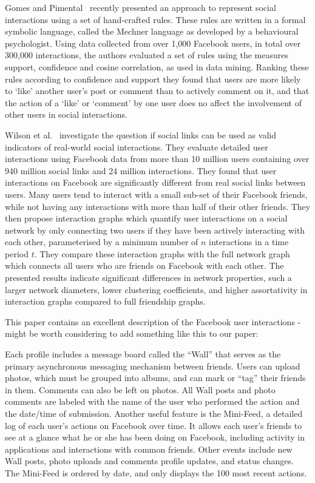\documentclass[letterpaper]{article}
\begin{document}
Gomes and Pimental~\cite{gomes2011social} recently presented an approach to represent social interactions using a set of hand-crafted rules. These rules are written in a formal symbolic language, called the Mechner language as developed by a behavioural psychologist. Using data collected from over 1,000 Facebook users, in total over 300,000 interactions, the authors evaluated a set of rules using the measures support, confidence and cosine correlation, as used in data mining. Ranking these rules according to confidence and support they found that users are more likely to `like' another user's post or comment than to actively comment on it, and that the action of a `like' or `comment' by one user does no affect the involvement of other users in social interactions.




Wilson et al.~\cite{wilson2009user} investigate the question if social links can be used as valid indicators of real-world social interactions. They evaluate detailed user interactions using Facebook data from more than 10 million users containing over 940 million social links and 24 million interactions. They found that user interactions on Facebook are significantly different from real social links between users. Many users tend to interact with a small sub-set of their Facebook friends, while not having any interactions with more than half of their other friends. They then propose interaction graphs which quantify user interactions on a social network by only connecting two users if they have been actively interacting with each other, parameterised by a minimum number of $n$ interactions in a time period $t$. They compare these interaction graphs with the full network graph which connects all users who are friends on Facebook with each other. The presented results indicate significant differences in network properties, such a larger network diameters, lower clustering coefficients, and higher assortativity in interaction graphs compared to full friendship graphs.






This paper contains an excellent description of the Facebook user interactions - might be worth considering to add something like this to our paper:


Each profile includes a message board called the “Wall” that serves as the primary asynchronous messaging mechanism between friends. Users can upload photos, which must be grouped into albums, and can mark or “tag” their friends in them. Comments can also be left on photos. All Wall posts and photo comments are labeled with the name of the user who performed the action and the date/time of submission. Another useful feature is the Mini-Feed, a detailed log of each user’s actions on Facebook over time. It allows each user’s friends to see at a glance what he or she has been doing on Facebook, including activity in applications and interactions with common friends. Other events include new Wall posts, photo uploads and comments profile updates, and status changes. The Mini-Feed is ordered by date, and only displays the 100 most recent actions.
\end{document}
